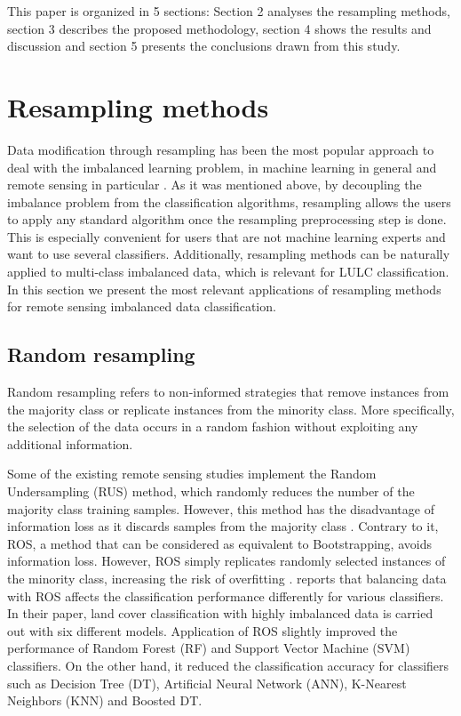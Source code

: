\documentclass[remotesensing,article,submit,moreauthors,pdftex]{Definitions/mdpi}
\begin{document}
This paper is organized in 5 sections: Section 2 analyses the resampling methods,
section 3 describes the proposed methodology, section 4 shows the results and
discussion and section 5 presents the conclusions drawn from this study.

\section{Resampling methods}

Data modification through resampling has been the most popular approach to deal
with the imbalanced learning problem, in machine learning in general and remote
sensing in particular \cite{Feng2019}. As it was mentioned above, by decoupling
the imbalance problem from the classification algorithms, resampling allows the
users to apply any standard algorithm once the resampling preprocessing step is
done. This is especially convenient for users that are not machine learning
experts and want to use several classifiers. Additionally, resampling methods
can be naturally applied to multi-class imbalanced data, which is relevant for
LULC classification. In this section we present the most relevant applications
of resampling methods for remote sensing imbalanced data classification.

\subsection{Random resampling}

Random resampling refers to non-informed strategies that remove instances from
the majority class or replicate instances from the minority class. More
specifically, the selection of the data occurs in a random fashion without
exploiting any additional information.


Some of the existing remote sensing studies implement the Random Undersampling
(RUS) method, which randomly reduces the number of the majority class training
samples. However, this method has the disadvantage of information loss as it
discards samples from the majority class \cite{Feng2019}. Contrary to it, ROS, a
method that can be considered as equivalent to Bootstrapping, avoids information
loss. However, ROS simply replicates randomly selected instances of the minority
class, increasing the risk of overfitting \cite{Krawczyk2016}.
\cite{Maxwell2018} reports that balancing data with ROS affects the
classification performance differently for various classifiers. In their paper,
land cover classification with highly imbalanced data is carried out with six
different models. Application of ROS slightly improved the performance of Random
Forest (RF) and Support Vector Machine (SVM) classifiers. On the other hand, it
reduced the classification accuracy for classifiers such as Decision Tree (DT),
Artificial Neural Network (ANN), K-Nearest Neighbors (KNN) and Boosted DT.
\end{document}
